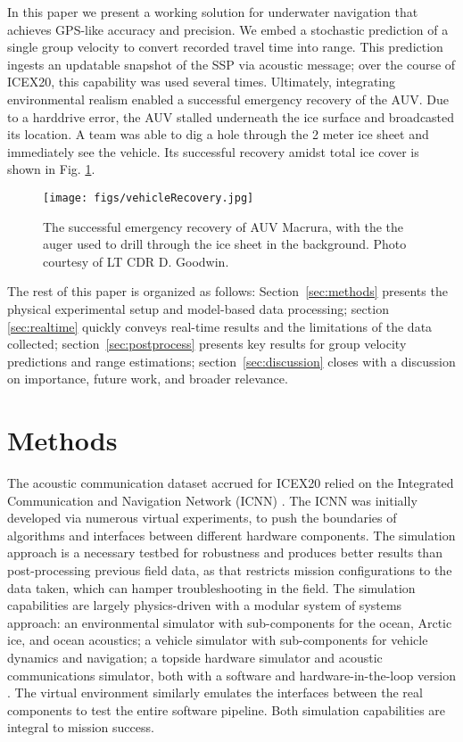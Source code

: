 In this paper we present a working solution for underwater navigation that achieves GPS-like accuracy and precision.
We embed a stochastic prediction of a single group velocity to convert recorded travel time into range.
This prediction ingests an updatable snapshot of the SSP via acoustic message; over the course of ICEX20, this capability was used several times. 
Ultimately, integrating environmental realism enabled a successful emergency recovery of the AUV.
Due to a harddrive error, the AUV stalled underneath the ice surface and broadcasted its location.
A team was able to dig a hole through the 2 meter ice sheet and immediately see the vehicle.
Its successful recovery amidst total ice cover is shown in Fig. \ref{fig:vehicleRecovery}.
\begin{figure}[h!]
	\centering
	\texttt{[image: figs/vehicleRecovery.jpg]}
	\caption{The successful emergency recovery of AUV Macrura, with the the auger used to drill through the ice sheet in the background. Photo courtesy of LT CDR D. Goodwin.}
	\label{fig:vehicleRecovery}
\end{figure} 

The rest of this paper is organized as follows: Section~\ref{sec:methods} presents the physical
experimental setup and model-based data processing; 
section \ref{sec:realtime} quickly conveys real-time results and the limitations of the data collected; section~\ref{sec:postprocess} presents key results for group velocity predictions and range estimations; section~\ref{sec:discussion} closes with a discussion on importance, future work, and broader relevance.

\section{\label{sec:methods} Methods}

The acoustic communication dataset accrued for ICEX20 relied on the Integrated Communication and Navigation Network (ICNN) \citep{schneider_self-adapting_2020,randeni_construction_2020,randeni_high-resolution_2021}.
The ICNN was initially developed via numerous virtual experiments, to push the boundaries of algorithms and interfaces between different hardware components.
The simulation approach is a necessary testbed for robustness and produces better results than post-processing previous field data, as that restricts mission configurations to the data taken, which can hamper troubleshooting in the field.
The simulation capabilities are largely physics-driven with a modular system of systems approach: an environmental simulator with sub-components for the ocean, Arctic ice, and ocean acoustics; a vehicle simulator with sub-components for vehicle dynamics and navigation; a topside hardware simulator and acoustic communications simulator, both with a software and hardware-in-the-loop version \citep{schneider_netsim_2018}.
The virtual environment similarly emulates the interfaces between the real components to test the entire software pipeline.
Both simulation capabilities are integral to mission success.

